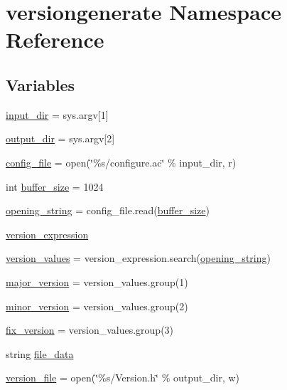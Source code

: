 \hypertarget{namespaceversiongenerate}{}\section{versiongenerate Namespace Reference}
\label{namespaceversiongenerate}
\subsection*{Variables}
\begin{DoxyCompactItemize}
\item 
\mbox{\hyperlink{namespaceversiongenerate_a68af424183a162a61507cdc378cf255e}{input\+\_\+dir}} = sys.\+argv\mbox{[}1\mbox{]}
\item 
\mbox{\hyperlink{namespaceversiongenerate_aab714e0aa9036025ba7c83eb7422c567}{output\+\_\+dir}} = sys.\+argv\mbox{[}2\mbox{]}
\item 
\mbox{\hyperlink{namespaceversiongenerate_afdfd8d6de9b62e742923b2b3326798e6}{config\+\_\+file}} = open(\char`\"{}\%s/configure.\+ac\char`\"{} \% input\+\_\+dir, \textquotesingle{}r\textquotesingle{})
\item 
int \mbox{\hyperlink{namespaceversiongenerate_a5656c48d43f7e869041b6a30c124702e}{buffer\+\_\+size}} = 1024
\item 
\mbox{\hyperlink{namespaceversiongenerate_a88cc36d80d757546e04817490ebb0640}{opening\+\_\+string}} = config\+\_\+file.\+read(\mbox{\hyperlink{namespaceversiongenerate_a5656c48d43f7e869041b6a30c124702e}{buffer\+\_\+size}})
\item 
\mbox{\hyperlink{namespaceversiongenerate_a83861e707250395976fdfee3396a0fff}{version\+\_\+expression}}
\item 
\mbox{\hyperlink{namespaceversiongenerate_a0ce22d4ba772e519b000413a3bf5445c}{version\+\_\+values}} = version\+\_\+expression.\+search(\mbox{\hyperlink{namespaceversiongenerate_a88cc36d80d757546e04817490ebb0640}{opening\+\_\+string}})
\item 
\mbox{\hyperlink{namespaceversiongenerate_a4b536109523f1bc805806f8d76ca34ac}{major\+\_\+version}} = version\+\_\+values.\+group(1)
\item 
\mbox{\hyperlink{namespaceversiongenerate_af8027cbccfcda6a243f0544cc3c08b28}{minor\+\_\+version}} = version\+\_\+values.\+group(2)
\item 
\mbox{\hyperlink{namespaceversiongenerate_aa92fb32c5f03f516f3b6224c620b66e4}{fix\+\_\+version}} = version\+\_\+values.\+group(3)
\item 
string \mbox{\hyperlink{namespaceversiongenerate_aa7a8a587902d8dc493945992ec3fcf60}{file\+\_\+data}}
\item 
\mbox{\hyperlink{namespaceversiongenerate_a3cb3deeb1538014cd32e4253fe298e27}{version\+\_\+file}} = open(\char`\"{}\%s/Version.\+h\char`\"{} \% output\+\_\+dir, \textquotesingle{}w\textquotesingle{})
\end{DoxyCompactItemize}


